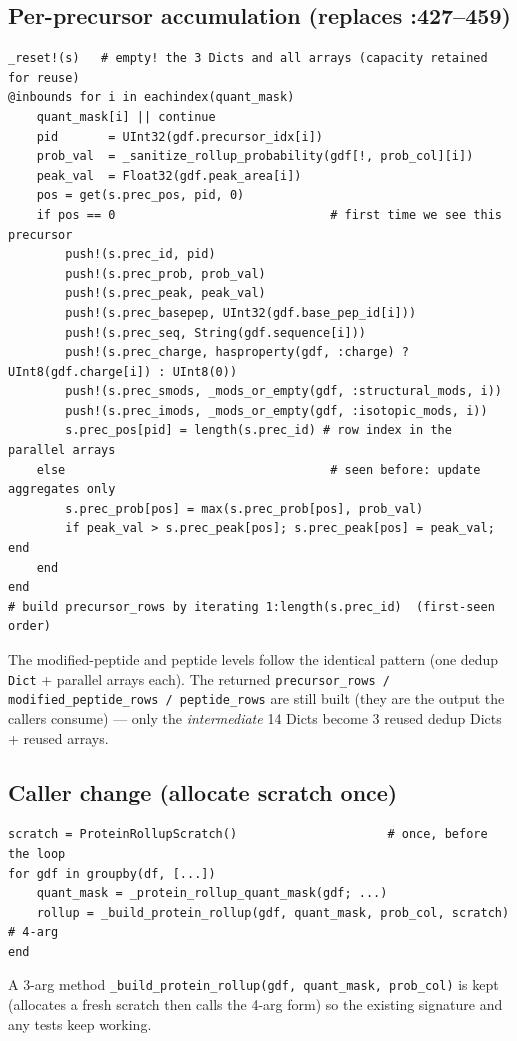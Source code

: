 \documentclass[11pt]{article}
\begin{document}
\subsection*{Per-precursor accumulation (replaces :427--459)}
\begin{lstlisting}
_reset!(s)   # empty! the 3 Dicts and all arrays (capacity retained for reuse)
@inbounds for i in eachindex(quant_mask)
    quant_mask[i] || continue
    pid       = UInt32(gdf.precursor_idx[i])
    prob_val  = _sanitize_rollup_probability(gdf[!, prob_col][i])
    peak_val  = Float32(gdf.peak_area[i])
    pos = get(s.prec_pos, pid, 0)
    if pos == 0                              # first time we see this precursor
        push!(s.prec_id, pid)
        push!(s.prec_prob, prob_val)
        push!(s.prec_peak, peak_val)
        push!(s.prec_basepep, UInt32(gdf.base_pep_id[i]))
        push!(s.prec_seq, String(gdf.sequence[i]))
        push!(s.prec_charge, hasproperty(gdf, :charge) ? UInt8(gdf.charge[i]) : UInt8(0))
        push!(s.prec_smods, _mods_or_empty(gdf, :structural_mods, i))
        push!(s.prec_imods, _mods_or_empty(gdf, :isotopic_mods, i))
        s.prec_pos[pid] = length(s.prec_id) # row index in the parallel arrays
    else                                     # seen before: update aggregates only
        s.prec_prob[pos] = max(s.prec_prob[pos], prob_val)
        if peak_val > s.prec_peak[pos]; s.prec_peak[pos] = peak_val; end
    end
end
# build precursor_rows by iterating 1:length(s.prec_id)  (first-seen order)
\end{lstlisting}
The modified-peptide and peptide levels follow the identical pattern (one dedup
\texttt{Dict} + parallel arrays each). The returned
\texttt{precursor\_rows / modified\_peptide\_rows / peptide\_rows} are still built
(they are the output the callers consume) --- only the \emph{intermediate} 14 Dicts
become 3 reused dedup Dicts + reused arrays.

\subsection*{Caller change (allocate scratch once)}
\begin{lstlisting}
scratch = ProteinRollupScratch()                     # once, before the loop
for gdf in groupby(df, [...])
    quant_mask = _protein_rollup_quant_mask(gdf; ...)
    rollup = _build_protein_rollup(gdf, quant_mask, prob_col, scratch)   # 4-arg
end
\end{lstlisting}
A 3-arg method \texttt{\_build\_protein\_rollup(gdf, quant\_mask, prob\_col)} is kept
(allocates a fresh scratch then calls the 4-arg form) so the existing signature and
any tests keep working.
\end{document}

